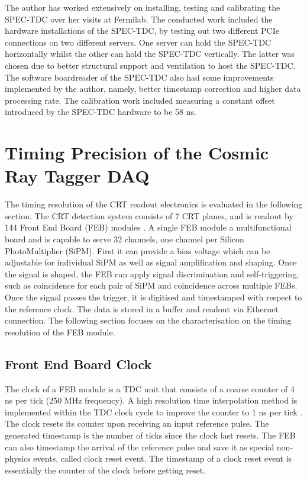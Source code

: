The author has worked extensively on installing, testing and calibrating the SPEC-TDC over her visits at Fermilab.
The  conducted work included the hardware installations of the SPEC-TDC, by testing out two different PCIe connections on two different servers. 
One server can hold the SPEC-TDC horizontally whilst the other can hold the SPEC-TDC vertically. 
The latter was chosen due to better structural support and ventilation to host the SPEC-TDC.
The software boardreader of the SPEC-TDC also had some improvements implemented by the author, namely, better timestamp correction and higher data processing rate.
The calibration work included measuring a constant offset introduced by the SPEC-TDC hardware to be 58 ns.

\section{Timing Precision of the Cosmic Ray Tagger DAQ}
\label{sec4InternalClock}

The timing resolution of the CRT readout electronics is evaluated in the following section.
The CRT detection system consists of 7 CRT planes, and is readout by 144 Front End Board (FEB) modules \cite{crt_note}. 
A single FEB module a multifunctional board and is capable to serve 32 channels, one channel per Silicon PhotoMultiplier (SiPM). 
First it can provide a bias voltage which can be adjustable for individual SiPM as well as signal amplification and shaping.
Once the signal is shaped, the FEB can apply signal discrimination and self-triggering, such as coincidence for each pair of SiPM and coincidence across multiple FEBs.
Once the signal passes the trigger, it is digitised and timestamped with respect to the reference clock.
The data is stored in a buffer and readout via Ethernet connection.
The following section focuses on the characterisation on the timing resolution of the FEB module.


\subsection{Front End Board Clock}

The clock of a FEB module is a TDC unit that consists of a coarse counter of 4 ns per tick (250 MHz frequency). 
A high resolution time interpolation method is implemented within the TDC clock cycle to improve the counter to 1 ns per tick \cite{crt_clock}.
The clock resets its counter upon receiving an input reference pulse.  
The generated timestamp is the number of ticks since the clock last resets.
The FEB can also timestamp the arrival of the reference pulse and save it as special non-physics events, called clock reset event.
The timestamp of a clock reset event is essentially the counter of the clock before getting reset.

